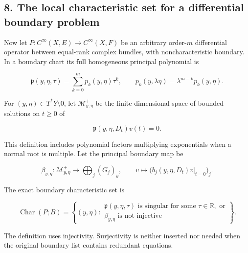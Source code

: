 \documentclass[
  11pt,
]{article}
\makeatletter
\let\ReaderOriginalAnchorStart\hyper@anchorstart
\let\ReaderOriginalAnchorEnd\hyper@anchorend
\let\ReaderPendingAliases\@empty
\def\ReaderArmAliases#1{\gdef\ReaderPendingAliases{#1}}
\def\hyper@anchorstart#1{\ReaderIfNativeAnchorTF{#1}{\ReaderPendingAliases\global\let\ReaderPendingAliases\@empty}{}\ReaderOriginalAnchorStart{#1}}
\makeatother
\begin{document}
\ReaderArmAliases{\ReaderOriginalAnchorStart{AN03-BWF-008}\ReaderOriginalAnchorEnd\begingroup\expandafter\def\csname @currentHref\endcsname{AN03-BWF-008}\label{AN03-BWF-008}\endgroup\ReaderOriginalAnchorStart{8-the-local-characteristic-set-for-a-differential-boundary-problem}\ReaderOriginalAnchorEnd\begingroup\expandafter\def\csname @currentHref\endcsname{8-the-local-characteristic-set-for-a-differential-boundary-problem}\label{8-the-local-characteristic-set-for-a-differential-boundary-problem}\endgroup}
\subsection{8. The local characteristic set for a differential boundary
problem}\label{the-local-characteristic-set-for-a-differential-boundary-problem}

Now let \(P:C^\infty(X,E)\to C^\infty(X,F)\) be an arbitrary order-\(m\)
differential operator between equal-rank complex bundles, with
noncharacteristic boundary. In a boundary chart its full homogeneous
principal polynomial is

\[
 \mathfrak p(y,\eta,\tau)
   =\sum_{k=0}^m p_k(y,\eta)\tau^k,
 \qquad p_k(y,\lambda\eta)=\lambda^{m-k}p_k(y,\eta).
 \tag{BW32}
\]

For \((y,\eta)\in T^*Y\setminus0\), let \(\mathscr M^+_{y,\eta}\) be the
finite-dimensional space of bounded solutions on \(t\geq0\) of

\[
 \mathfrak p(y,\eta,D_t)v(t)=0.
 \tag{BW33}
\]

This definition includes polynomial factors multiplying exponentials
when a normal root is multiple. Let the principal boundary map be

\[
 \beta_{y,\eta}:\mathscr M^+_{y,\eta}\longrightarrow
       \bigoplus_j(G_j)_y,\qquad
 v\longmapsto\bigl(b_j(y,\eta,D_t)v|_{t=0}\bigr)_j.
 \tag{BW34}
\]

The exact boundary characteristic set is

\[
 \operatorname{Char}(P;B)=
 \left\{(y,\eta):
 \begin{array}{l}
 \mathfrak p(y,\eta,\tau)\text{ is singular for some }\tau\in\mathbb R,
 \text{ or}\\
 \beta_{y,\eta}\text{ is not injective}
 \end{array}\right\}.
 \tag{BW35}
\]

The definition uses injectivity. Surjectivity is neither inserted nor
needed when the original boundary list contains redundant equations.
\end{document}
